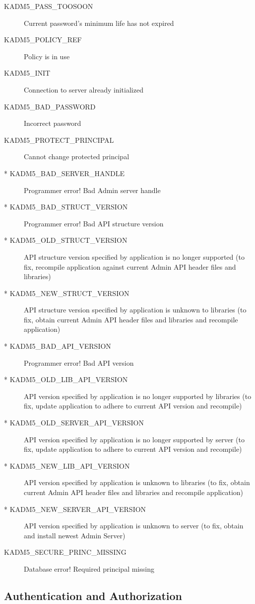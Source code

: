 \begin{description}
\item[KADM5_PASS_TOOSOON] Current password's minimum life has not
expired
\item[KADM5_POLICY_REF] Policy is in use
\item[KADM5_INIT] Connection to server already initialized
\item[KADM5_BAD_PASSWORD] Incorrect password
\item[KADM5_PROTECT_PRINCIPAL] Cannot change protected principal
\item[* KADM5_BAD_SERVER_HANDLE] Programmer error!  Bad Admin server handle
\item[* KADM5_BAD_STRUCT_VERSION] Programmer error!  Bad API structure version
\item[* KADM5_OLD_STRUCT_VERSION] API structure version specified by application is no longer supported (to fix, recompile application against current Admin API header files and libraries)
\item[* KADM5_NEW_STRUCT_VERSION] API structure version specified by application is unknown to libraries (to fix, obtain current Admin API header files and libraries and recompile application)
\item[* KADM5_BAD_API_VERSION] Programmer error!  Bad API version
\item[* KADM5_OLD_LIB_API_VERSION] API version specified by application is no longer supported by libraries (to fix, update application to adhere to current API version and recompile)
\item[* KADM5_OLD_SERVER_API_VERSION] API version specified by application is no longer supported by server (to fix, update application to adhere to current API version and recompile)
\item[* KADM5_NEW_LIB_API_VERSION] API version specified by application is unknown to libraries (to fix, obtain current Admin API header files and libraries and recompile application)
\item[* KADM5_NEW_SERVER_API_VERSION] API version specified by
application is unknown to server (to fix, obtain and install newest
Admin Server)
\item[KADM5_SECURE_PRINC_MISSING] Database error! Required principal missing
\end{description}

\subsection{Authentication and Authorization}
\label{sec:auth}

